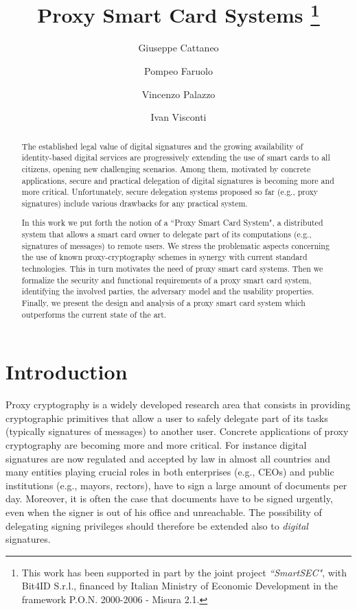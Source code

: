 \documentclass[runningheads]{llncs}
\begin{document}
\title{Proxy Smart Card Systems
\thanks{
This work has been supported in part by the joint project {\sl
``SmartSEC"},  with Bit4ID S.r.l., financed by Italian Ministry of Economic Development in the framework P.O.N. 2000-2006 - Misura 2.1.}}

\author{ Giuseppe Cattaneo \and  Pompeo Faruolo \and Vincenzo Palazzo \and Ivan Visconti }


\maketitle
\begin{abstract}
The established legal value of digital signatures and the growing availability of identity-based digital services are progressively extending the use of smart cards to all citizens, opening new challenging scenarios.  Among them, motivated by concrete applications, secure and practical delegation of digital signatures is becoming more and more critical. Unfortunately, secure delegation systems proposed so far (e.g., proxy signatures)  include various drawbacks for any practical system.

In this work we put forth the notion of a ``Proxy Smart Card System", a distributed system that allows a smart card owner to delegate part of its computations (e.g., signatures of messages) to remote users.  We stress the problematic aspects concerning the use of known proxy-cryptography schemes in synergy with current standard technologies. This in turn motivates the need of proxy smart card systems. Then we formalize the security and functional requirements of a proxy smart card system, identifying the involved parties, the adversary model and the usability properties. Finally, we present the design and analysis of a proxy smart card system which outperforms the current state of the art.
\end{abstract}


\section{Introduction}
Proxy cryptography is a widely developed research area that consists in providing cryptographic primitives that allow  a user to safely delegate part of its tasks (typically signatures of messages) to another user. Concrete applications of proxy cryptography are becoming more and more critical. For instance digital signatures are now regulated and accepted by law in almost all countries and many entities playing crucial roles in both enterprises (e.g., CEOs) and public institutions (e.g., mayors, rectors),  have to sign a large amount of documents per day. Moreover, it is often the case that documents have to be signed urgently, even when the signer is out of his office and unreachable. The possibility of delegating signing privileges should therefore be extended also to {\em digital} signatures.
\end{document}
